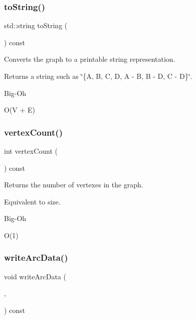 \subsubsection{\texorpdfstring{to\+String()}{toString()}}
{\footnotesize\ttfamily std\+::string to\+String (\begin{DoxyParamCaption}{ }\end{DoxyParamCaption}) const\hspace{0.3cm}{\ttfamily [inherited]}}



Converts the graph to a printable string representation. 

\begin{DoxyReturn}{Returns}
a string such as {\ttfamily \char`\"{}\{\+A, B, C, D, A -\/ B, B -\/ D, C -\/ D\}\char`\"{}}. 
\end{DoxyReturn}
\begin{DoxyRefDesc}{Big-\/\+Oh}
\item[\mbox{\hyperlink{BigOh__BigOh000090}{Big-\/\+Oh}}]O(V + E) \end{DoxyRefDesc}
\mbox{\label{classBasicGraphGen_a68eb4830a4800ed7704895c16a8982be}} 
\subsubsection{\texorpdfstring{vertex\+Count()}{vertexCount()}}
{\footnotesize\ttfamily int vertex\+Count (\begin{DoxyParamCaption}{ }\end{DoxyParamCaption}) const}



Returns the number of vertexes in the graph. 

Equivalent to size. \begin{DoxyRefDesc}{Big-\/\+Oh}
\item[\mbox{\hyperlink{BigOh__BigOh000037}{Big-\/\+Oh}}]O(1) \end{DoxyRefDesc}
\mbox{\label{classBasicGraphGen_ae7be688f4ddbd7da8eb2a8c7eef8901c}} 
\subsubsection{\texorpdfstring{write\+Arc\+Data()}{writeArcData()}}
{\footnotesize\ttfamily void write\+Arc\+Data (\begin{DoxyParamCaption}\item[{std\+::ostream \&}]{,  }\item[{Edge\+Gen$<$ V, E $>$ $\ast$}]{ }\end{DoxyParamCaption}) const\hspace{0.3cm}{\ttfamily [virtual]}}



